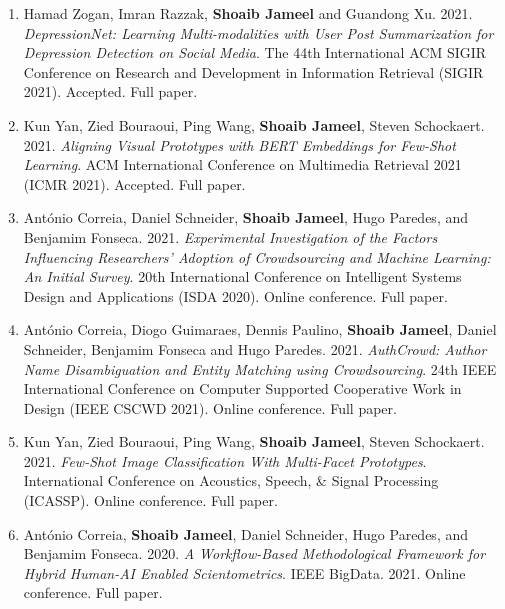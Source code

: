\documentclass[margin]{res}
\begin{document}
\begin{resume}
\begin{enumerate}
\item Hamad Zogan, Imran Razzak, \textbf{Shoaib Jameel} and Guandong Xu. 2021. \textit{DepressionNet: Learning Multi-modalities with User Post Summarization for Depression Detection on Social Media}. The 44th International ACM SIGIR Conference on Research and Development in Information Retrieval (SIGIR 2021). Accepted. Full paper. \newline

\item Kun Yan, Zied Bouraoui, Ping Wang, \textbf{Shoaib Jameel}, Steven Schockaert. 2021. \textit{Aligning Visual Prototypes with BERT Embeddings for Few-Shot Learning}. ACM International Conference on Multimedia Retrieval 2021 (ICMR 2021). Accepted. Full paper. \newline

\item Ant\'onio Correia, Daniel Schneider, \textbf{Shoaib Jameel}, Hugo Paredes, and Benjamim Fonseca. 2021. \textit{Experimental Investigation of the Factors Influencing Researchers' Adoption of Crowdsourcing and Machine Learning: An Initial Survey}. 20th International Conference on Intelligent Systems Design and Applications (ISDA 2020). Online conference. Full paper. \newline

\item Ant\'onio Correia, Diogo Guimaraes, Dennis Paulino, \textbf{Shoaib Jameel}, Daniel Schneider, Benjamim Fonseca and Hugo Paredes. 2021. \textit{AuthCrowd: Author Name Disambiguation and Entity Matching using Crowdsourcing}. 24th IEEE International Conference on Computer Supported Cooperative Work in Design (IEEE CSCWD 2021). Online conference. Full paper. \newline

\item Kun Yan, Zied Bouraoui, Ping Wang, \textbf{Shoaib Jameel}, Steven Schockaert. 2021. \textit{Few-Shot Image Classification With Multi-Facet Prototypes}. International Conference on Acoustics, Speech, \& Signal Processing (ICASSP). Online conference. Full paper. \newline

\item Ant\'onio Correia, \textbf{Shoaib Jameel}, Daniel Schneider, Hugo Paredes, and Benjamim Fonseca. 2020. \textit{A Workflow-Based Methodological Framework for Hybrid Human-AI Enabled Scientometrics}. IEEE BigData. 2021. Online conference. Full paper. \newline


\end{enumerate}
\end{resume}
\end{document}
